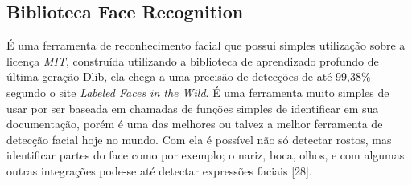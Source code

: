 \subsection{Biblioteca Face Recognition}
É uma ferramenta de reconhecimento facial que possui simples utilização sobre a licença \textit{MIT}, construída utilizando a biblioteca de aprendizado profundo de última geração Dlib, ela chega a uma precisão de detecções de até 99,38\% segundo o site \textit{Labeled Faces in the Wild}. É uma ferramenta muito simples de usar por ser baseada em chamadas de funções simples de identificar em sua documentação, porém é uma das melhores ou talvez a melhor ferramenta de detecção facial hoje no mundo.
Com ela é possível não só detectar rostos, mas identificar partes do face como por exemplo; o nariz, boca, olhos, e com algumas outras integrações pode-se até detectar expressões faciais [28].

